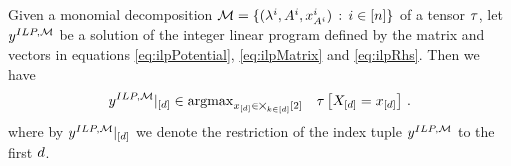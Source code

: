 \begin{theorem}
    Given a monomial decomposition $\mathcal{M}=\{(\lambda^{i}, A^{i}, x_{A^{i}}^{i}) \, : \, i\in[n]\}$ of a tensor $\tau$, let  $y^{ILP,\mathcal{M}}$ be a solution of the integer linear program defined by the matrix and vectors in equations \eqref{eq:ilpPotential}, \eqref{eq:ilpMatrix} and \eqref{eq:ilpRhs}.
    Then we have
    \begin{align*}
        {y^{ILP,\mathcal{M}}}|_{[d]} \in \mathrm{argmax}_{x_{[d]}\in\bigtimes_{k\in[d]}[2]} \quad \tau\left[X_{[d]}=x_{[d]}\right] \, .
    \end{align*}
    where by  ${y^{ILP,\mathcal{M}}}|_{[d]}$ we denote the restriction of the index tuple $y^{ILP,\mathcal{M}}$ to the first $d$.
\end{theorem}
